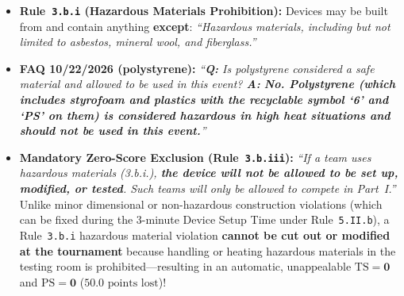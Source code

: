 \begin{rulebox}
\begin{itemize}
  \item \textbf{Rule~\texttt{3.b.i} (Hazardous Materials Prohibition):} Devices may be built from and contain anything \textbf{except}: \textit{``Hazardous materials, including but not limited to asbestos, mineral wool, and fiberglass.''} 
  \item \textbf{FAQ 10/22/2026 (polystyrene):} \textit{``\textbf{Q:} Is polystyrene considered a safe material and allowed to be used in this event? \textbf{A:} \textbf{No. Polystyrene (which includes styrofoam and plastics with the recyclable symbol `6' and `PS' on them) is considered hazardous in high heat situations and should not be used in this event.}''} 
  \item \textbf{Mandatory Zero-Score Exclusion (Rule~\texttt{3.b.iii}):} \textit{``If a team uses hazardous materials (3.b.i.), \textbf{the device will not be allowed to be set up, modified, or tested}. Such teams will only be allowed to compete in Part~I.''}  Unlike minor dimensional or non-hazardous construction violations (which can be fixed during the 3-minute Device Setup Time under Rule~\texttt{5.II.b}), a Rule~\texttt{3.b.i} hazardous material violation \textbf{cannot be cut out or modified at the tournament} because handling or heating hazardous materials in the testing room is prohibited—resulting in an automatic, unappealable $\mathbf{\mathrm{TS} = 0}$ and $\mathbf{\mathrm{PS} = 0}$ ($50.0\text{ points lost}$)!
\end{itemize}
\end{rulebox}

